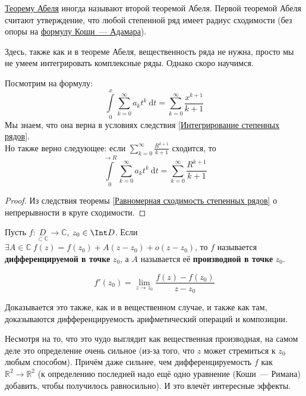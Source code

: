 \documentclass{article}
\begin{document}
    \begin{remark}
        \hyperref[Теорема Абеля о степенных рядах]{Теорему Абеля} иногда называют второй теоремой Абеля. Первой теоремой Абеля считают утверждение, что любой степенной ряд имеет радиус сходимости (без опоры на \hyperref[Формула Коши-Адамара]{формулу Коши~--- Адамара}).
    \end{remark}
    \begin{remark}
        Здесь, также как и в теореме Абеля, вещественность ряда не нужна, просто мы не умеем интегрировать комплексные ряды. Однако скоро научимся.
    \end{remark}
    \begin{claim}
        Посмотрим на формулу:
        $$
        \int\limits_0^x\sum\limits_{k=0}^\infty a_kt^k~\mathrm dt=
        \sum\limits_{k=0}^\infty\frac{x^{k+1}}{k+1}
        $$
        Мы знаем, что она верна в условиях следствия \ref{Интегрирование степенных рядов}.\\
        Но также верно следующее: если $\sum\limits_{k=0}^\infty\frac{R^{k+1}}{k+1}$ сходится, то
        $$
        \int\limits_0^{\to R}\sum\limits_{k=0}^\infty a_kt^k~\mathrm dt=
        \sum\limits_{k=0}^\infty\frac{R^{k+1}}{k+1}
        $$
    \end{claim}
    \begin{proof}
        Из следствия теоремы \ref{Равномерная сходимость степенных рядов} о непрерывности в круге сходимости.
    \end{proof}
    \begin{definition}
        Пусть $f\colon\underset{\subset\mathbb C}D\to\mathbb C$, $z_0\in\Int D$. Если $\exists A\in\mathbb C~f(z)=f(z_0)+A(z-z_0)+o(z-z_0)$, то $f$ называется \textbf{дифференцируемой в точке} $z_0$, а $A$ называется её \textbf{производной в точке} $z_0$.
    \end{definition}
    \begin{claim}
        $$
        f'(z_0)=\lim\limits_{z\to z_0}\frac{f(z)-f(z_0)}{z-z_0}
        $$
    \end{claim}
    \begin{remark}
        Доказывается это также, как и в вещественном случае, и также как там, доказываются дифференцируемость арифметический операций и композиции.
    \end{remark}
    \begin{remark}
        Несмотря на то, что это чудо выглядит как вещественная производная, на самом деле это определение очень сильное (из-за того, что $z$ может стремиться к $z_0$ любым способом). Причём даже сильнее, чем дифференцируемость $f$ как $\mathbb R^2\to\mathbb R^2$ (к определению последней надо ещё одно уравнение (Коши~--- Римана) добавить, чтобы получилось равносильно). И это влечёт интересные эффекты.
    \end{remark}
\end{document}
